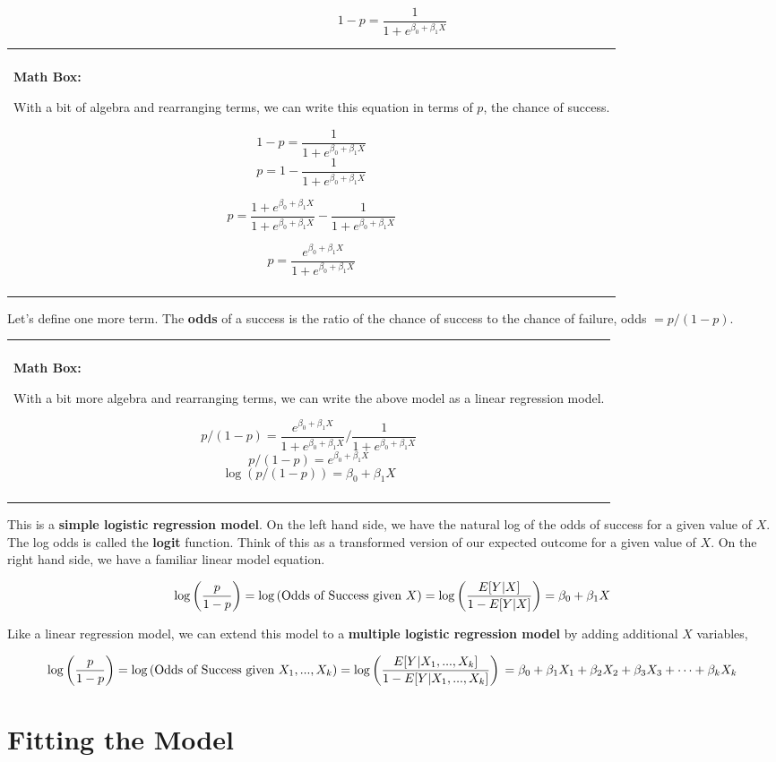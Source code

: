 \documentclass[
]{book}
\newenvironment{mathbox}
{
    \begin{center}
    
    \begin{tabular}{|p{0.8\textwidth}|}
    \rowcolor{LightYellow}
    \hline\\
    \rowcolor{LightYellow}
    \textbf{Math Box:}
}
{
    \\\rowcolor{LightYellow}
    \\\hline
    \end{tabular} 
    \end{center}
}
\begin{document}
\[1-p = \frac{1}{1 + e^{\beta_0 +\beta_1X}}\]

\begin{mathbox}
With a bit of algebra and rearranging terms, we can write this equation
in terms of \(p\), the chance of success.

\[1-p = \frac{1}{1 + e^{\beta_0 +\beta_1X}}\]
\[p = 1-\frac{1}{1 + e^{\beta_0 +\beta_1X}}\]

\[p = 
\frac{1 + e^{\beta_0 +\beta_1X}}{1 + e^{\beta_0 +\beta_1X}}-\frac{1}{1 + e^{\beta_0 +\beta_1X}}\]

\[p = \frac{e^{\beta_0 +\beta_1X}}{1 + e^{\beta_0 +\beta_1X}}\]
\end{mathbox}

Let's define one more term. The \textbf{odds} of a success is the ratio of the chance of success to the chance of failure, odds \(=p/(1-p)\).

\begin{mathbox}
With a bit more algebra and rearranging terms, we can write the above
model as a linear regression model.

\[p/(1-p) = \frac{e^{\beta_0 +\beta_1X}}{1 + e^{\beta_0 +\beta_1X}}/\frac{1}{1 + e^{\beta_0 +\beta_1X}}\]
\[p/(1-p) = e^{\beta_0 +\beta_1X}\]
\[\log(p/(1-p)) = \beta_0 +\beta_1X\]
\end{mathbox}

This is a \textbf{simple logistic regression model}. On the left hand side, we have the natural log of the odds of success for a given value of \(X\). The log odds is called the \textbf{logit} function. Think of this as a transformed version of our expected outcome for a given value of \(X\). On the right hand side, we have a familiar linear model equation.

\[\log\left(\frac{p}{1-p}\right) =\log\left(\hbox{Odds of Success given } X\right) = \log\left(\frac{E[Y|X]}{1-E[Y|X]}\right) = \beta_0 +\beta_1X\]

Like a linear regression model, we can extend this model to a \textbf{multiple logistic regression model} by adding additional \(X\) variables,

\[\log\left(\frac{p}{1-p}\right) =\log\left(\hbox{Odds of Success given } X_1,...,X_k\right)= \log\left(\frac{E[Y|X_1,...,X_k]}{1-E[Y|X_1,...,X_k]}\right) \\ = \beta_0 +\beta_1X_1+\beta_2X_2+\beta_3X_3+\cdots +\beta_kX_k\]

\hypertarget{fitting-the-model}{%
\section{Fitting the Model}\label{fitting-the-model}}
\end{document}
